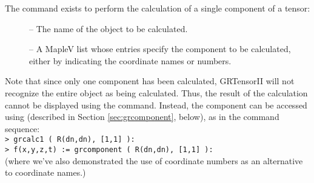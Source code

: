 \documentclass{article}
\begin{document}
The command  exists to perform the calculation of a single
component of a tensor:\\
%
\begin{cmdspec}
  \label{spec:grcalc1}

  \begin{description}
    \item[] -- The name of the object to be calculated.
    \item[] -- A MapleV list whose entries specify the
      component to be calculated, either by indicating the coordinate names
      or numbers.
  \end{description}

\end{cmdspec}

Note that since only one component has been calculated, GRTensorII 
will not recognize the entire object as being calculated. Thus, the 
result of the calculation cannot be displayed using the 
command. Instead, the component can be accessed using 
(described in Section \ref{sec:grcomponent}, below), as in the command
sequence:\\

\noindent\texttt{> grcalc1 ( R(dn,dn), [1,1] ):} \\
\texttt{> f(x,y,z,t) := grcomponent ( R(dn,dn), [1,1] ):}\\

\noindent (where we've also demonstrated the use of coordinate numbers
as an alternative to coordinate names.)
%
\end{document}

